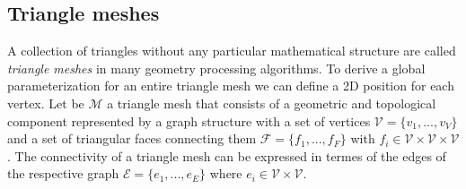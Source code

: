 \subsection{Triangle meshes}
A collection of triangles without any particular mathematical structure are called \textit{triangle meshes} in many geometry processing algorithms. To derive a global parameterization for an entire triangle mesh we can define a 2D position for each vertex. Let be $\mathcal{M}$ a triangle mesh that consists of a geometric and topological component represented by a graph structure with a set of vertices $\mathcal{V} = \{ v_1, ..., v_V \}$ and a set of triangular faces connecting them $\mathcal{F} = \{ f_1, ... , f_F \}$ with $f_i \in \mathcal{V} \times \mathcal{V} \times \mathcal{V}$. The connectivity of a triangle mesh can be expressed in termes of the edges of the respective graph $\mathcal{E} = \{ e_1, ..., e_E \}$ where $e_i \in \mathcal{V} \times \mathcal{V}$.
